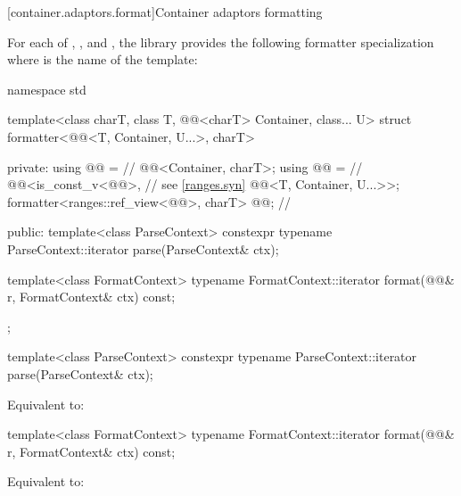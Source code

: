 [container.adaptors.format]{Container adaptors formatting}

\pnum
For each of
,
, and
,
the library provides the following formatter specialization
where  is the name of the template:

%
\begin{codeblock}
namespace std {
  template<class charT, class T, @@<charT> Container, class... U>
  struct formatter<@@<T, Container, U...>, charT> {
  private:
    using @@ =                                             // \expos
      @@<Container, charT>;
    using @@ =                                               // \expos
      @@<is_const_v<@@>,                          // see \ref{ranges.syn}
                  @@<T, Container, U...>>;
    formatter<ranges::ref_view<@@>, charT> @@;    // \expos

  public:
    template<class ParseContext>
      constexpr typename ParseContext::iterator
        parse(ParseContext& ctx);

    template<class FormatContext>
      typename FormatContext::iterator
        format(@@& r, FormatContext& ctx) const;
  };
}
\end{codeblock}

%
\begin{itemdecl}
template<class ParseContext>
  constexpr typename ParseContext::iterator
    parse(ParseContext& ctx);
\end{itemdecl}

\begin{itemdescr}
\pnum
\effects
Equivalent to: 
\end{itemdescr}

%
\begin{itemdecl}
template<class FormatContext>
  typename FormatContext::iterator
    format(@@& r, FormatContext& ctx) const;
\end{itemdecl}

\begin{itemdescr}
\pnum
\effects
Equivalent to: 
\end{itemdescr}

